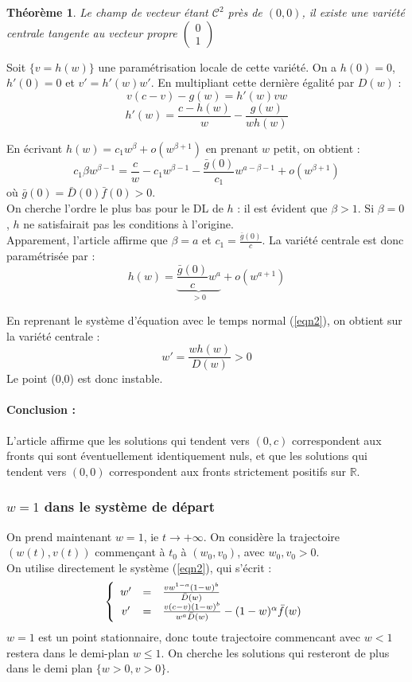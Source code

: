\documentclass{article}
\newtheorem{theorem}{Théorème}[subsection]
\begin{document}
\begin{theorem}
Le champ de vecteur étant $\mathcal{C}^2$ près de $(0,0)$, il existe une variété centrale tangente au vecteur propre $\begin{pmatrix} 0\\ 1 \end{pmatrix}$
\end{theorem}

Soit $\{v=h(w)\}$ une paramétrisation locale de cette variété. On a $h(0)=0$, $h'(0)=0$ et $v'=h'(w)w'$. En multipliant cette dernière égalité par $D(w)$ : 
\[v(c-v)-g(w)=h'(w)vw\]
\[h'(w)=\frac{c-h(w)}{w}-\frac{g(w)}{wh(w)}\]

En écrivant $h(w)=c_1 w^\beta+o(w^{\beta+1})$ en prenant $w$ petit, on obtient :
\[c_1\beta w^{\beta-1}=\frac{c}{w}-c_1w^{\beta-1}-\frac{\bar{g}(0)}{c_1}w^{a-\beta-1}+o(w^{\beta+1})\]
où $\bar{g}(0)=\bar{D}(0)\bar{f}(0)>0$.\\
On cherche l'ordre le plus bas pour le DL de $h$ : il est évident que $\beta>1$. Si $\beta=0$, $h$ ne satisfairait pas les conditions à l'origine.\\
Apparement, l'article affirme que $\beta=a$ et $c_1=\frac{\bar{g}(0)}{c}$. La variété centrale est donc paramétrisée par : 
\[h(w)=\underbrace{\frac{\bar{g}(0)}{c}w^a}_{>0}+o(w^{a+1})\]

En reprenant le système d'équation avec le temps normal (\ref{eqn2}), on obtient sur la variété centrale : \[w'=\frac{wh(w)}{D(w)}>0\]
Le point (0,0) est donc instable.

\paragraph{Conclusion :} L'article affirme que les solutions qui tendent vers $(0,c)$ correspondent aux fronts qui sont éventuellement identiquement nuls, et que les solutions qui tendent vers $(0,0)$ correspondent aux fronts strictement positifs sur $\mathbb{R}$.

\subsubsection{$w=1$ dans le système de départ}

	On prend maintenant $w=1$, ie $t\to+\infty$. On considère la trajectoire $(w(t), v(t))$ commençant à $t_0$ à $(w_0, v_0)$, avec $w_0,v_0>0$.\\
On utilise directement le système (\ref{eqn2}), qui s'écrit : 
\[\left\{ \begin{array}{c c l}
w'&=&\frac{vw^{1-a}(1-w)^b}{\bar{D}(w)}\\
v'&=&\frac{v(c-v)(1-w)^b}{w^a\bar{D}(w)}-(1-w)^\alpha \bar{f}(w)
\end{array}\right.\] 
$w=1$ est un point stationnaire, donc toute trajectoire commencant avec $w<1$ restera dans le demi-plan $w\leq 1$. On cherche les solutions qui resteront de plus dans le demi plan $\{w>0, v>0\}$.
\end{document}
